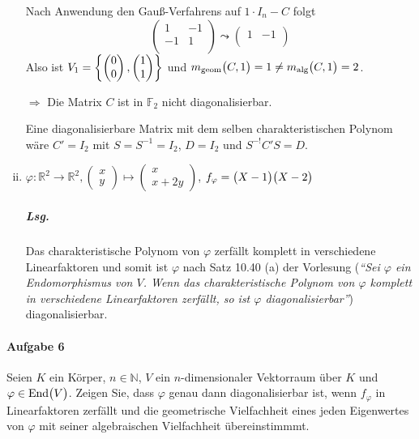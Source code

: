 \documentclass{scrreprt}
\newcommand{\End}{\text{End}}
\begin{document}
\begin{enumerate}[(i)]
  Nach Anwendung den Gauß-Verfahrens auf $1 \cdot I_n - C$ folgt
  \[
    \begin{pmatrix}
      1 & -1 \\
      -1 & 1 \\
    \end{pmatrix}
    \leadsto
    \begin{pmatrix}
      1 & -1 \\
    \end{pmatrix}    
  \]
  Also ist $V_1 = \qty{
    \begin{pmatrix}0\\0\end{pmatrix},
    \begin{pmatrix}1\\1\end{pmatrix}
  }$ und $m_{\text{geom}}\qty\big(C, 1) = 1 \ne
  m_{\text{alg}}\qty\big(C, 1) = 2$.

  $\Rightarrow$ Die Matrix $C$ ist in $\mathbb{F}_2$ nicht diagonalisierbar.

  Eine diagonalisierbare Matrix mit dem selben charakteristischen Polynom
  wäre $C' = I_2$ mit $S = S^{-1} = I_2$, $D = I_2$ und $S^{-!}C'S = D$.

\item $\varphi \colon \mathbb{R}^2 \to \mathbb{R}^2,
  \begin{pmatrix}x\\y\end{pmatrix} \mapsto \begin{pmatrix}x\\x+2y\end{pmatrix}$,
  $f_{\varphi} = \qty\big(X - 1)\qty\big(X - 2)$

  \subparagraph{Lsg.} Das charakteristische Polynom von $\varphi$ zerfällt komplett in
  verschiedene Linearfaktoren und somit ist $\varphi$ nach Satz 10.40 (a) der Vorlesung
  (\emph{``Sei $\varphi$ ein Endomorphismus von $V$.
    Wenn das charakteristische Polynom von $\varphi$ komplett in verschiedene
    Linearfaktoren zerfällt, so ist $\varphi$ diagonalisierbar''}) diagonalisierbar.
\end{enumerate}

\newpage
\paragraph{Aufgabe 6} Seien $K$ ein Körper, $n \in \mathbb{N}$, $V$ ein
$n$-dimensionaler Vektorraum über $K$ und $\varphi \in \End\qty\big(V)$.
Zeigen Sie, dass $\varphi$ genau dann diagonalisierbar ist, wenn
$f_{\varphi}$ in Linearfaktoren zerfällt und die geometrische Vielfachheit eines
jeden Eigenwertes von $\varphi$ mit seiner algebraischen Vielfachheit
übereinstimmmt.
\end{document}
